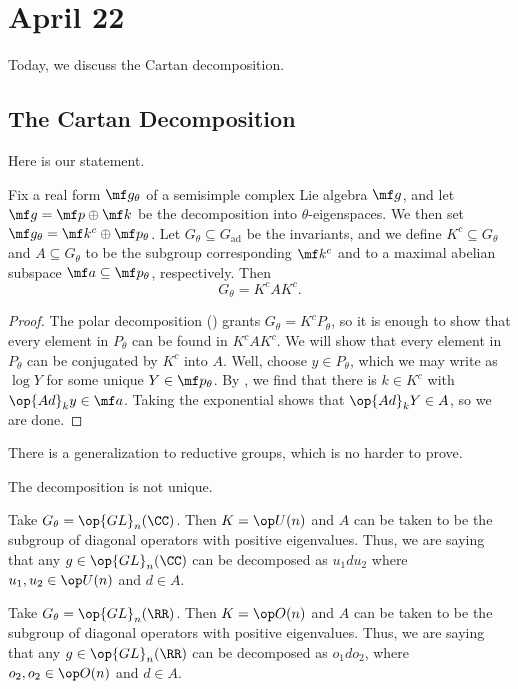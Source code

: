 \documentclass[../notes.tex]{subfiles}
\begin{document}
\section{April 22}
Today, we discuss the Cartan decomposition.

\subsection{The Cartan Decomposition}
Here is our statement.
\begin{theorem}
	Fix a real form $\mf g_\theta$ of a semisimple complex Lie algebra $\mf g$, and let $\mf g=\mf p\oplus\mf k$ be the decomposition into $\theta$-eigenspaces. We then set $\mf g_\theta=\mf k^c\oplus\mf p_\theta$. Let $G_\theta\subseteq G_{\mathrm{ad}}$ be the invariants, and we define $K^c\subseteq G_\theta$ and $A\subseteq G_\theta$ to be the subgroup corresponding $\mf k^c$ and to a maximal abelian subspace $\mf a\subseteq\mf p_\theta$, respectively. Then
	\[G_\theta=K^cAK^c.\]
\end{theorem}
\begin{proof}
	The polar decomposition () grants $G_\theta=K^cP_\theta$, so it is enough to show that every element in $P_\theta$ can be found in $K^cAK^c$. We will show that every element in $P_\theta$ can be conjugated by $K^c$ into $A$. Well, choose $y\in P_\theta$, which we may write as $\log Y$ for some unique $Y\in\mf p_\theta$. By , we find that there is $k\in K^c$ with $\op{Ad}_ky\in\mf a$. Taking the exponential shows that $\op{Ad}_kY\in A$, so we are done.
\end{proof}
\begin{remark}
	There is a generalization to reductive groups, which is no harder to prove.
\end{remark}
\begin{remark}
	The decomposition is not unique.
\end{remark}
\begin{example}
	Take $G_\theta=\op{GL}_n(\CC)$. Then $K=\op U(n)$ and $A$ can be taken to be the subgroup of diagonal operators with positive eigenvalues. Thus, we are saying that any $g\in\op{GL}_n(\CC)$ can be decomposed as $u_1du_2$ where $u_1,u_2\in\op U(n)$ and $d\in A$.
\end{example}
\begin{example} \label{ex:cartan-gln-r}
	Take $G_\theta=\op{GL}_n(\RR)$. Then $K=\op O(n)$ and $A$ can be taken to be the subgroup of diagonal operators with positive eigenvalues. Thus, we are saying that any $g\in\op{GL}_n(\RR)$ can be decomposed as $o_1do_2$, where $o_2,o_2\in\op O(n)$ and $d\in A$.
\end{example}
\end{document}
